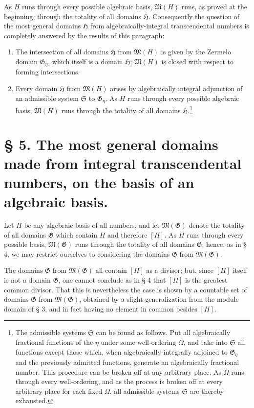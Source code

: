 \documentclass[11pt]{article}
\begin{document}
As $H$ runs through every possible algebraic basis, $\mathfrak M(H)$ runs, as
proved at the beginning, through the totality of all domains $\mathfrak H$.
Consequently the question of the most general domains $\mathfrak H$ from
algebraically-integral transcendental numbers is completely answered by the
results of this paragraph:
\begin{enumerate}
\item[a)] The intersection of all domains $\mathfrak H$ from $\mathfrak M(H)$ is
given by the Zermelo domain $\mathfrak G_\eta$, which itself is a domain
$\mathfrak H$; $\mathfrak M(H)$ is closed with respect to forming intersections.
\item[b)] Every domain $\mathfrak H$ from $\mathfrak M(H)$ arises by
algebraically integral adjunction of an admissible system $\mathfrak S$ to
$\mathfrak G_\eta$. As $H$ runs through every possible algebraic basis,
$\mathfrak M(H)$ runs through the totality of all domains $\mathfrak H$.\footnote{The
admissible systems $\mathfrak S$ can be found as follows. Put all algebraically
fractional functions of the $\eta$ under some well-ordering $\Omega$, and take
into $\mathfrak S$ all functions except those which, when algebraically-integrally
adjoined to $\mathfrak G_\eta$ and the previously admitted functions, generate an
algebraically fractional number. This procedure can be broken off at any arbitrary
place. As $\Omega$ runs through every well-ordering, and as the process is broken
off at every arbitrary place for each fixed $\Omega$, all admissible systems
$\mathfrak S$ are thereby exhausted.}
\end{enumerate}




\section*{§ 5. The most general domains made from integral transcendental numbers, on the basis of an algebraic basis.}

Let $H$ be any algebraic basis of all numbers, and let
$\mathfrak M(\mathfrak G)$ denote the totality of all domains $\mathfrak G$
which contain $H$ and therefore $[H]$. As $H$ runs through every possible basis,
$\mathfrak M(\mathfrak G)$ runs through the totality of all domains
$\mathfrak G$; hence, as in § 4, we may restrict ourselves to considering the
domains $\mathfrak G$ from $\mathfrak M(\mathfrak G)$.

The domains $\mathfrak G$ from $\mathfrak M(\mathfrak G)$ all contain $[H]$ as
a divisor; but, since $[H]$ itself is not a domain $\mathfrak G$, one cannot
conclude as in § 4 that $[H]$ is the greatest common divisor. That this is
nevertheless the case is shown by a countable set of domains $\mathfrak G$ from
$\mathfrak M(\mathfrak G)$, obtained by a slight generalization from the module
domain of § 3, and in fact having no element in common besides $[H]$.
\end{document}
